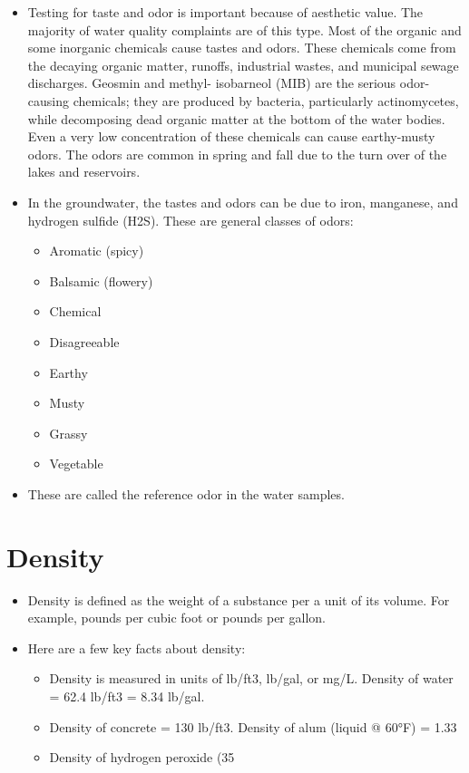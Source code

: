 \begin{enumerate}
\begin{itemize}
\item Testing for taste and odor is important because of aesthetic value. The majority of water quality complaints are of this type. Most of the organic and some inorganic chemicals cause tastes and odors. These chemicals come from the decaying organic matter, runoffs, industrial wastes, and municipal sewage discharges. Geosmin and methyl- isobarneol (MIB) are the serious odor-causing chemicals; they are produced by bacteria, particularly actinomycetes, while decomposing dead organic matter at the bottom of the water bodies. Even a very low concentration of these chemicals can cause earthy-musty odors. The odors are common in spring and fall due to the turn over of the lakes and reservoirs. 
\item In the groundwater, the tastes and odors can be due to iron, manganese, and hydrogen sulfide (H2S).
These are general classes of odors:
\begin{itemize}
\item Aromatic (spicy)
\item Balsamic (flowery) 
\item Chemical 
\item Disagreeable
\item Earthy
\item Musty
\item Grassy
\item Vegetable
\end{itemize}
 
\item These are called the reference odor in the water samples.
\end{itemize}


\section{Density}
\begin{itemize}
\item Density is defined as the weight of a substance per a unit of its volume. For example, pounds per cubic foot or pounds per gallon.

\item Here are a few key facts about density:
\begin{itemize}

\item Density is measured in units of lb/ft3, lb/gal, or mg/L. Density of water = 62.4 lb/ft3 = 8.34 lb/gal.
\item Density of concrete = 130 lb/ft3. Density of alum (liquid @ 60°F) = 1.33
\item Density of hydrogen peroxide (35%
\end{itemize}
\end{itemize}


\end{enumerate}

